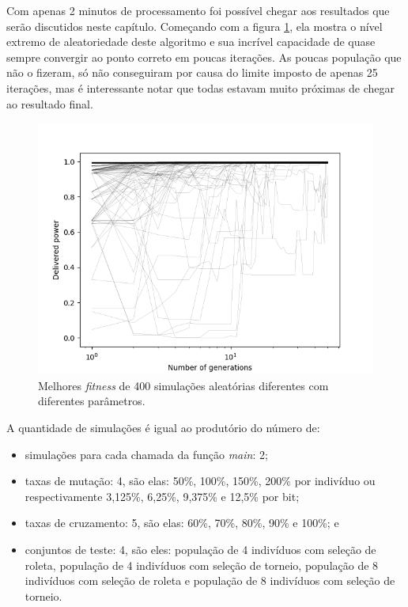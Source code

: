 \documentclass[12pt]{article}
\begin{document}
Com apenas 2 minutos de processamento foi possível chegar aos resultados que serão discutidos neste capítulo. Começando com  a figura \ref{fig:fitgeral}, ela mostra o nível extremo de aleatoriedade deste algoritmo e sua incrível capacidade de quase sempre convergir ao ponto correto em poucas iterações. As poucas população que não o fizeram, só não conseguiram por causa do limite imposto de apenas 25 iterações, mas é interessante notar que todas estavam muito próximas de chegar ao resultado final.

\begin{figure}
    \centering
    \includegraphics{fig/generations.png}
    \caption{Melhores \textit{fitness} de 400 simulações aleatórias diferentes com diferentes parâmetros.}
    \label{fig:fitgeral}
\end{figure}

A quantidade de simulações é igual ao produtório do número de:

\begin{itemize}
    \item simulações para cada chamada da função \textit{main}: 2;
    \item taxas de mutação: 4, são elas: 50\%, 100\%, 150\%, 200\% por indivíduo ou respectivamente 3,125\%, 6,25\%, 9,375\% e 12,5\% por bit;
    \item taxas de cruzamento: 5, são elas: 60\%, 70\%, 80\%, 90\% e 100\%; e
    \item conjuntos de teste: 4, são eles: população de 4 indivíduos com seleção de roleta, população de 4 indivíduos com seleção de torneio, população de 8 indivíduos com seleção de roleta e população de 8 indivíduos com seleção de torneio.
\end{itemize}
\end{document}
